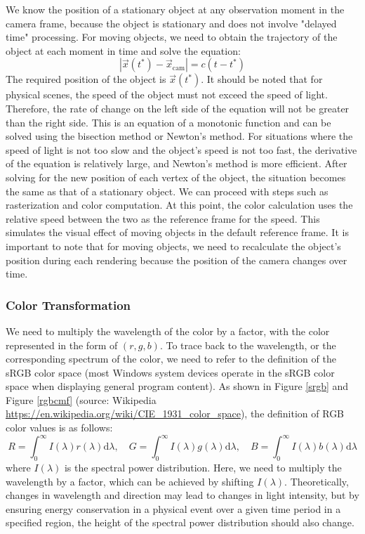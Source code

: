 \documentclass{article}
\begin{document}
We know the position of a stationary object at any observation moment in the camera frame, because the object is stationary and does not involve "delayed time" processing. For moving objects, we need to obtain the trajectory of the object at each moment in time and solve the equation:
$$|\vec{x}(t^{*}) - \vec{x}_{\text{cam}}| = c(t - t^{*})$$
The required position of the object is $\vec{x}(t^{*})$. It should be noted that for physical scenes, the speed of the object must not exceed the speed of light. Therefore, the rate of change on the left side of the equation will not be greater than the right side. This is an equation of a monotonic function and can be solved using the bisection method or Newton's method. For situations where the speed of light is not too slow and the object's speed is not too fast, the derivative of the equation is relatively large, and Newton's method is more efficient. After solving for the new position of each vertex of the object, the situation becomes the same as that of a stationary object. We can proceed with steps such as rasterization and color computation. At this point, the color calculation uses the relative speed between the two as the reference frame for the speed. This simulates the visual effect of moving objects in the default reference frame. It is important to note that for moving objects, we need to recalculate the object's position during each rendering because the position of the camera changes over time.

\subsubsection*{Color Transformation}

We need to multiply the wavelength of the color by a factor, with the color represented in the form of $(r, g, b)$. To trace back to the wavelength, or the corresponding spectrum of the color, we need to refer to the definition of the sRGB color space (most Windows system devices operate in the sRGB color space when displaying general program content). As shown in Figure \ref{srgb} and Figure \ref{rgbcmf} (source: Wikipedia \url{https://en.wikipedia.org/wiki/CIE_1931_color_space}), the definition of RGB color values is as follows:
$$R = \int_{0}^{\infty} I(\lambda) r(\lambda) \mathrm{d} \lambda, \quad G = \int_{0}^{\infty} I(\lambda) g(\lambda) \mathrm{d} \lambda, \quad B = \int_{0}^{\infty} I(\lambda) b(\lambda) \mathrm{d} \lambda$$
where $I(\lambda)$ is the spectral power distribution. Here, we need to multiply the wavelength by a factor, which can be achieved by shifting $I(\lambda)$. Theoretically, changes in wavelength and direction may lead to changes in light intensity, but by ensuring energy conservation in a physical event over a given time period in a specified region, the height of the spectral power distribution should also change.
\end{document}
